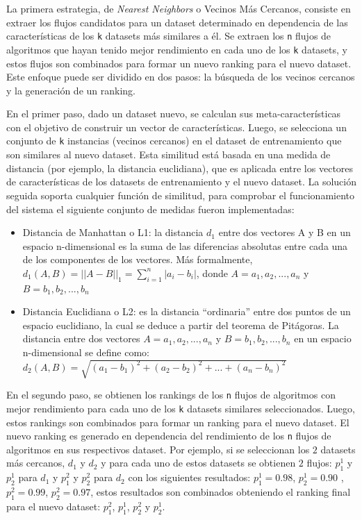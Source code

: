 La primera estrategia, de \textit{Nearest Neighbors} o Vecinos Más Cercanos, consiste en extraer los flujos candidatos para un dataset determinado en dependencia de las características de los \texttt{k} datasets más similares a él. Se extraen los \texttt{n} flujos de algoritmos que hayan tenido mejor rendimiento en cada uno de los \texttt{k} datasets, y estos flujos son combinados para formar un nuevo ranking para el nuevo dataset. Este enfoque puede ser dividido en dos pasos: la búsqueda de los vecinos cercanos y la generación de un ranking.

En el primer paso, dado un dataset nuevo, se calculan sus meta-características con el objetivo de construir un vector de características. Luego, se selecciona un conjunto de \texttt{k} instancias (vecinos cercanos) en el dataset de entrenamiento que son similares al nuevo dataset. Esta similitud está basada en una medida de distancia (por ejemplo, la distancia euclidiana), que es aplicada entre los vectores de características de los datasets de entrenamiento y el nuevo dataset. La solución seguida soporta cualquier función de similitud, para comprobar el funcionamiento del sistema el siguiente conjunto de medidas fueron implementadas:

\begin{itemize}
	\item Distancia de Manhattan o L1: la distancia $d_1$ entre dos vectores A y B en un espacio n-dimensional es la suma de las diferencias absolutas entre cada una de los componentes de los vectores. Más formalmente, $d_1(A, B) = {||A - B||}_1 = \sum^n_{i=1} |a_i - b_i|$, donde $A = a_1, a_2, ..., a_n$ y $B = b_1, b_2, ..., b_n$
	\item Distancia Euclidiana o L2: es la distancia ``ordinaria'' entre dos puntos de un espacio euclidiano, la cual se deduce a partir del teorema de Pitágoras. La distancia entre dos vectores $A = a_1, a_2, ..., a_n$ y $B = b_1, b_2, ..., b_n$ en un espacio n-dimensional se define como: $d_2(A, B)=\sqrt{(a_1 - b_1)^2 + (a_2 - b_2)^2 + ... + (a_n - b_n)^2}$
\end{itemize}

En el segundo paso, se obtienen los rankings de los \texttt{n} flujos de algoritmos con mejor rendimiento para cada uno de los \texttt{k} datasets similares seleccionados. Luego, estos rankings son combinados para formar un ranking para el nuevo dataset. El nuevo ranking es generado en dependencia del rendimiento de los \texttt{n} flujos de algoritmos en sus respectivos dataset. Por ejemplo, si se seleccionan los $2$ datasets más cercanos, $d_1$ y $d_2$ y para cada uno de estos datasets se obtienen $2$ flujos: $p^1_1$ y $p^1_2$ para $d_1$ y $p^2_1$ y $p^2_2$ para $d_2$ con los siguientes resultados: $p^1_1 = 0.98$, $p^1_2 = 0.90$ , $p^2_1 = 0.99$, $p^2_2 = 0.97$, estos resultados son combinados obteniendo el ranking final para el nuevo dataset: $p^2_1$, $p^1_1$, $p^2_2$ y $p^1_2$.

